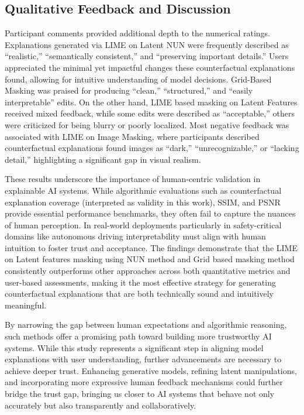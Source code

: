 \vspace{0.5em}
\subsection{Qualitative Feedback and Discussion}
Participant comments provided additional depth to the numerical ratings. Explanations generated via LIME on Latent NUN were frequently described as “realistic,” “semantically consistent,” and “preserving important details.” Users appreciated the minimal yet impactful changes these counterfactual explanations found, allowing for intuitive understanding of model decisions. Grid-Based Masking was praised for producing “clean,” “structured,” and “easily interpretable” edits. On the other hand, LIME based masking on Latent Features received mixed feedback, while some edits were described as “acceptable,” others were criticized for being blurry or poorly localized. Most negative feedback was associated with LIME on Image Masking, where participants described counterfactual explanations found images as “dark,” “unrecognizable,” or “lacking detail,” highlighting a significant gap in visual realism.

These results underscore the importance of human-centric validation in explainable AI systems. While algorithmic evaluations such as counterfactual explanation coverage (interpreted as validity in this work), SSIM, and PSNR provide essential performance benchmarks, they often fail to capture the nuances of human perception. In real-world deployments particularly in safety-critical domains like autonomous driving interpretability must align with human intuition to foster trust and acceptance. The findings demonstrate that the LIME on Latent features masking using NUN method and Grid based masking method consistently outperforms other approaches across both quantitative metrics and user-based assessments, making it the most effective strategy for generating counterfactual explanations that are both technically sound and intuitively meaningful.

By narrowing the gap between human expectations and algorithmic reasoning, such methods offer a promising path toward building more trustworthy AI systems. While this study represents a significant step in aligning model explanations with user understanding, further advancements are necessary to achieve deeper trust. Enhancing generative models, refining latent manipulations, and incorporating more expressive human feedback mechanisms could further bridge the trust gap, bringing us closer to AI systems that behave not only accurately but also transparently and collaboratively.
